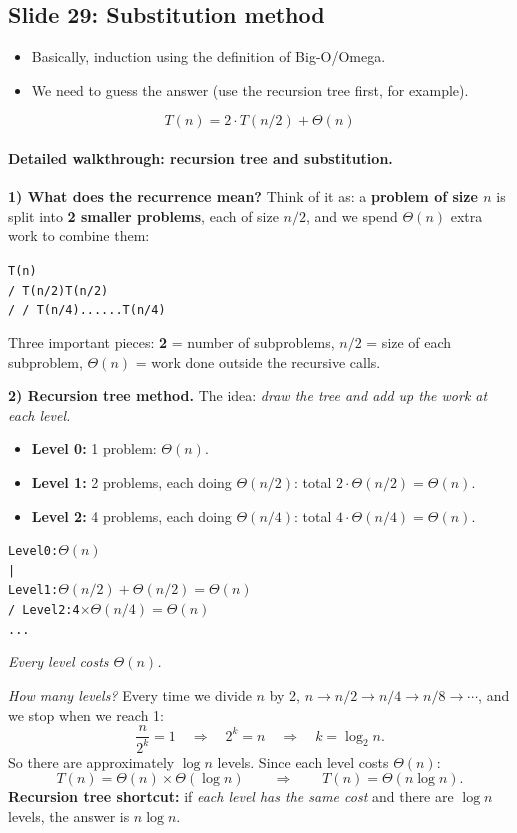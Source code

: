 \documentclass[11pt]{article}
\newcommand{\slide}[2]{\subsection*{Slide #1: #2}}
\begin{document}
\slide{29}{Substitution method}
\begin{itemize}
  \item Basically, induction using the definition of Big-O/Omega.
  \item We need to guess the answer (use the recursion tree first, for example).
\end{itemize}
\[
  T(n) = 2 \cdot T(n/2) + \Theta(n)
\]

\paragraph{Detailed walkthrough: recursion tree and substitution.}

\textbf{1) What does the recurrence mean?}
Think of it as: a \textbf{problem of size $n$} is split into \textbf{2 smaller problems}, each
of size $n/2$, and we spend $\Theta(n)$ extra work to combine them:
\begin{alltt}
                 T(n)
               /      \
           T(n/2)    T(n/2)
           /  \       /  \
        T(n/4) ...  ...  T(n/4)
\end{alltt}
Three important pieces: \textbf{2} = number of subproblems, \textbf{$n/2$} = size of each
subproblem, \textbf{$\Theta(n)$} = work done outside the recursive calls.

\textbf{2) Recursion tree method.}
The idea: \emph{draw the tree and add up the work at each level.}
\begin{itemize}
  \item \textbf{Level 0:} 1 problem: $\Theta(n)$.
  \item \textbf{Level 1:} 2 problems, each doing $\Theta(n/2)$:
        total $2 \cdot \Theta(n/2) = \Theta(n)$.
  \item \textbf{Level 2:} 4 problems, each doing $\Theta(n/4)$:
        total $4 \cdot \Theta(n/4) = \Theta(n)$.
\end{itemize}
\begin{alltt}
Level 0:        \(\Theta(n)\)
                 |
Level 1:     \(\Theta(n/2) + \Theta(n/2) = \Theta(n)\)
              /          \
Level 2:   4 \(\times\) \(\Theta(n/4) = \Theta(n)\)
                 ...
\end{alltt}
\emph{Every level costs $\Theta(n)$.}

\emph{How many levels?} Every time we divide $n$ by 2,
$n \to n/2 \to n/4 \to n/8 \to \cdots$, and we stop when we reach 1:
\[
  \frac{n}{2^k} = 1 \quad\Longrightarrow\quad 2^k = n \quad\Longrightarrow\quad k = \log_2 n.
\]
So there are approximately $\log n$ levels. Since each level costs $\Theta(n)$:
\[
  T(n) = \Theta(n) \times \Theta(\log n)
  \qquad\Longrightarrow\qquad
  \boxed{T(n) = \Theta(n \log n)}.
\]
\textbf{Recursion tree shortcut:} if \emph{each level has the same cost} and there are
$\log n$ levels, the answer is $n \log n$.
\end{document}
